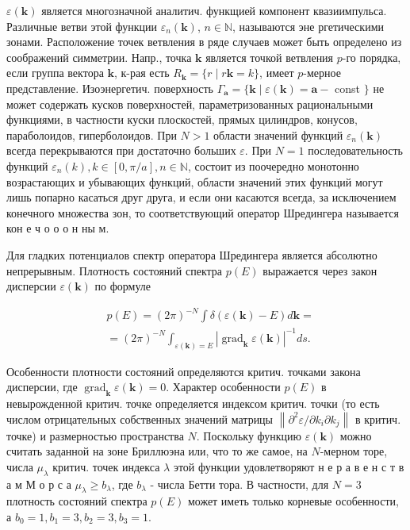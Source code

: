 \documentclass[10pt]{article}
\begin{document}
$\varepsilon(\boldsymbol{k})$ является многозначной аналитич. функщией компонент квазиимпульса. Различные ветви этой функции $\varepsilon_{n}(\boldsymbol{k})$, $n \in \mathbb{N}$, называются эне ргетическими зонами. Расположение точек ветвления в ряде случаев может быть определено из соображений симметрии. Напр., точка $\boldsymbol{k}$ является точкой ветвления $p$-го порядка, если группа вектора $\boldsymbol{k}$, к-рая есть $R_{\boldsymbol{k}}=\{r \mid r \boldsymbol{k}=k\}$, имеет $p$-мерное представление. Изоэнергетич. поверхность $\Gamma_{\boldsymbol{a}}=\{\boldsymbol{k} \mid \varepsilon(\boldsymbol{k})=\boldsymbol{a}-$ const $\}$ не может содержать кусков поверхностей, параметризованных рациональными функциями, в частности куски плоскостей, прямых цилиндров, конусов, параболоидов, гиперболоидов. При $N>1$ области значений функций $\varepsilon_{n}(\boldsymbol{k})$ всегда перекрываются при достаточно больших $\varepsilon$. При $N=1$ последовательность функций $\varepsilon_{n}(k), k \in[0, \pi / a], n \in \mathbb{N}$, состоит из поочередно монотонно возрастающих и убывающих функций, области значений этих функций могут лишь попарно касаться друг друга, и если они касаются всегда, за исключением конечного множества зон, то соответствующий оператор Шредингера называется кон е ч о о о н ны м.



Для гладких потенциалов спектр оператора Шредингера является абсолютно непрерывным. Плотность состояний спектра $p(E)$ выражается через закон дисперсии $\varepsilon(\boldsymbol{k})$ по формуле



\[

\begin{aligned}

& p(E)=(2 \pi)^{-N} \int \delta(\varepsilon(\boldsymbol{k})-E) d \boldsymbol{k}= \\

& =(2 \pi)^{-N} \int_{\varepsilon(\boldsymbol{k})=E}\left|\operatorname{grad}_{\boldsymbol{k}} \varepsilon(\boldsymbol{k})\right|^{-1} d s .

\end{aligned}

\]



Особенности плотности состояний определяются критич. точками закона дисперсии, где $\operatorname{grad}_{\boldsymbol{k}} \varepsilon(\boldsymbol{k})=0$. Характер особенности $p(E)$ в невырожденной критич. точке определяется индексом критич. точки (то есть числом отрицательных собственных значений матрицы $\left\|\partial^{2} \varepsilon / \partial k_{i} \partial k_{j}\right\|$ в критич. точке) и размерностью пространства $N$. Поскольку функцию $\varepsilon(\boldsymbol{k})$ можно считать заданной на зоне Бриллюэна или, что то же самое, на $N$-мерном торе, числа $\mu_{\lambda}$ критич. точек индекса $\lambda$ этой функции удовлетворяют н е р а в е н с т в а м М о р с а $\mu_{\lambda} \geqslant b_{\lambda}$, где $b_{\lambda}$ - числа Бетти тора. В частности, для $N=3$ плотность состояний спектра $p(E)$ может иметь только корневые особенности, а $b_{0}=1, b_{1}=3, b_{2}=3, b_{3}=1$.
\end{document}
